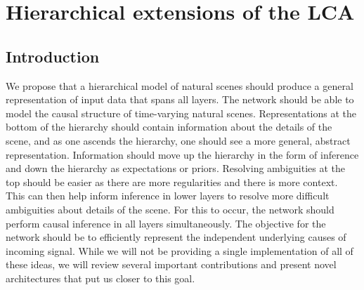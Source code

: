 \chapter{Hierarchical extensions of the LCA}\label{ch:hierarchical_sc}

\section{Introduction}\label{sec:ch3_intro}
We propose that a hierarchical model of natural scenes should produce a general representation of input data that spans all layers. The network should be able to model the causal structure of time-varying natural scenes. Representations at the bottom of the hierarchy should contain information about the details of the scene, and as one ascends the hierarchy, one should see a more general, abstract representation. Information should move up the hierarchy in the form of inference and down the hierarchy as expectations or priors. Resolving ambiguities at the top should be easier as there are more regularities and there is more context. This can then help inform inference in lower layers to resolve more difficult ambiguities about details of the scene. For this to occur, the network should perform causal inference in all layers simultaneously. The objective for the network should be to efficiently represent the independent underlying causes of incoming signal. While we will not be providing a single implementation of all of these ideas, we will review several important contributions and present novel architectures that put us closer to this goal.

